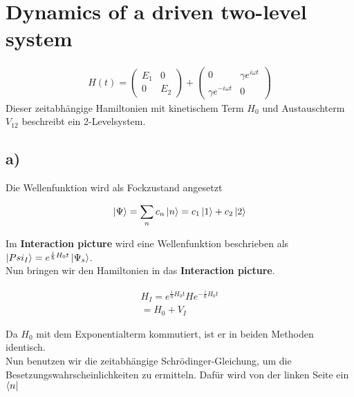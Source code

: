 \section{Dynamics of a driven two-level system}

\begin{align}
H \left( t \right)=
\begin{pmatrix}
E_1 & 0 \\ 0 & E_2
\end{pmatrix}
+
\begin{pmatrix}
0 & \gamma e^{i \omega t} \\ \gamma e^{-i \omega t} & 0
\end{pmatrix}
\end{align}
Dieser zeitabh\"angige Hamiltonien mit kinetischem Term $H_0$ und Austauschterm $V_{12}$ beschreibt ein 2-Levelsystem.

\subsection{a)}

Die Wellenfunktion wird als Fockzustand angesetzt

\begin{align}
\Ket{\Psi} = \sum_n c_n \Ket{n} = c_1 \Ket{1} + c_2 \Ket{2}
\end{align}

Im \textbf{Interaction picture} wird eine Wellenfunktion beschrieben als $\Ket{Psi_I} = e^{\frac{i}{\hbar}H_0 t} \Ket{\Psi_s}$.\\
Nun bringen wir den Hamiltonien in das  \textbf{Interaction picture}.

\begin{align}
H_I = e^{\frac{i}{\hbar}H_0 t} H e^{-\frac{i}{\hbar}H_0 t} \\
= H_0 + V_I
\end{align}

Da $H_0$ mit dem Exponentialterm kommutiert, ist er in beiden Methoden identisch.\\
Nun benutzen wir die zeitabh\"angige Schr\"odinger-Gleichung, um die Besetzungswahrscheinlichkeiten zu ermitteln. Daf\"ur wird von der linken Seite ein $\Bra{n}$ 

